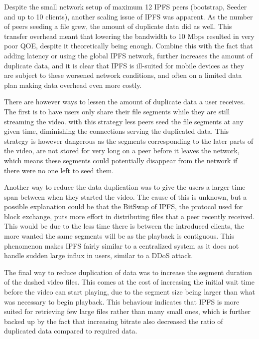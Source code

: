 Despite the small network setup of maximum 12 \ac{IPFS} peers (bootstrap, Seeder and up to 10 clients), another scaling issue of \ac{IPFS} was apparent. As the number of peers seeding a file grew, the amount of duplicate data did as well. This transfer overhead meant that lowering the bandwidth to 10 \ac{Mbps} resulted in very poor \ac{QOE}, despite it theoretically being enough. Combine this with the fact that adding latency or using the global \ac{IPFS} network, further increases the amount of duplicate data, and it is clear that \ac{IPFS} is ill-suited for mobile devices as they are subject to these worsened network conditions, and often on a limited data plan making data overhead even more costly. 

There are however ways to lessen the amount of duplicate data a user receives.
The first is to have users only share their file segments while they are still streaming the video.
with this strategy less peers seed the file segments at any given time, diminishing the connections serving the duplicated data. This strategy is however dangerous as the segments corresponding to the later parts of the video, are not stored for very long on a peer before it leaves the network, which means these segments could potentially disappear from the network if there were no one left to seed them. 

Another way to reduce the data duplication was to give the users a larger time span between when they started the video. The cause of this is unknown, but a possible explanation could be that the BitSwap of \ac{IPFS}, the protocol used for block exchange, puts more effort in distributing files that a peer recently received. This would be due to the less time there is between the introduced clients, the more wanted the same segments will be as the playback is contiguous.
This phenomenon makes \ac{IPFS} fairly similar to a centralized system as it does not handle sudden large influx in users, similar to a \ac{DDoS} attack.

The final way to reduce duplication of data was to increase the segment duration of the dashed video files. This comes at the cost of increasing the initial wait time before the video can start playing, due to the segment size being larger than what was necessary to begin playback. This behaviour indicates that \ac{IPFS} is more suited for retrieving few large files rather than many small ones, which is further backed up by the fact that increasing bitrate also decreased the ratio of duplicated data compared to required data.

